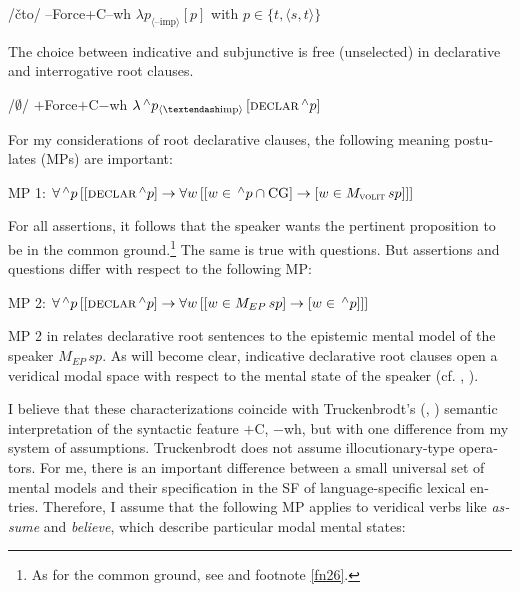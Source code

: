 \documentclass[output=paper,colorlinks,citecolor=brown]{langscibook}
\begin{document}
\begin{otherlanguage}{english}
{\begin{exe}
\ex	\label{stiftr}
\begin{xlist}
	\ex /čto/
    \ex --Force+C--wh 
    \ex $\lambda p_{\langle –\text{imp} \rangle} [p] $ \newline
    with $p \in \{t, \langle s, t \rangle \} $
\end{xlist}
\end{exe}


} The choice between indicative and subjunctive is free (unselected) in declarative and interrogative root clauses.

\begin{exe}
\ex	\label{ex:16:10}
\begin{xlist}
	\ex /$\emptyset$/
    \ex  $+$Force$+$C$-$wh
    \ex  $\lambda \, ^{\wedge} p_{\langle–\text{imp} \rangle} \, [\textsc{declar} \, ^{\wedge} p ] $
\end{xlist}
\end{exe}

\noindent For my considerations of root declarative clauses, the following meaning postulates (MPs) are important:

\begin{exe}
\ex MP 1: $\forall\, ^{\wedge} p \, [[\textsc{declar} \, ^{\wedge} p] \to \forall w \, [[w \in \, ^{\wedge}p \cap \text{CG}]  \to [w \in M_{\textsc{volit}} \, sp]]] $ \label{ex:16:11}
\end{exe}

\noindent For all assertions, it follows that the speaker wants the pertinent proposition to be in the common ground.\footnote{As for the common ground, see  and footnote \ref{fn26}.
} The same is true with questions. But assertions and questions differ with respect to the following MP:

\begin{exe}
\ex MP 2: $\forall \, ^{\wedge} p \, [[\textsc{declar} \, ^{\wedge}p] \to    \forall w \, [[w \in M_{EP} \, sp] \to [w \in \, ^{\wedge}p]]] $ \label{ex:16:12}
\end{exe}

\noindent MP 2 in  relates declarative root sentences to the epistemic mental model of the speaker $M_{EP} \,  sp$. As will become clear, indicative declarative root clauses open a veridical modal space with respect to the mental state of the speaker (cf. \citealt{Giannakidou2014}, \citeyear{Giannakidou2016}).

I believe that these characterizations coincide with Truckenbrodt’s (\citeyear{Truckenbrodt2006}, \citeyear{Truckenbrodt2006a}) semantic interpretation of the syntactic feature $+$C, $-$wh, but with one difference from my system of assumptions. Truckenbrodt does not assume illocutio\-nary-type operators. For me, there is an important difference between a small universal set of mental models and their specification in the SF of language-specific lexical entries. Therefore, I assume that the following MP applies to veridical verbs like \textit{assume} and \textit{believe}, which describe particular modal mental states:


\end{otherlanguage}
\end{document}

